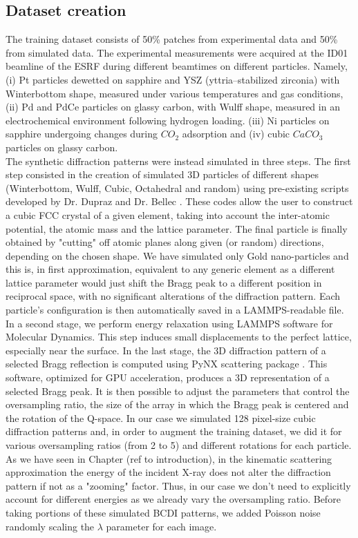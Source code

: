 \subsection{Dataset creation}
The training dataset consists of 50\% patches from experimental data and 50\% from simulated data.
The experimental measurements were acquired at the ID01 beamline of the ESRF during different beamtimes on different particles.
Namely, (i) Pt particles dewetted on sapphire and YSZ (yttria–stabilized zirconia) with Winterbottom shape, 
measured under various temperatures and gas conditions, (ii) Pd and PdCe particles on glassy carbon, with
Wulff shape, measured in an electrochemical environment following hydrogen loading. (iii) Ni particles on sapphire undergoing
changes during $CO_2$ adsorption and (iv) cubic $CaCO_3$ particles on glassy carbon.
\\
The synthetic diffraction patterns were instead simulated in three steps. The first step consisted in the creation of 
simulated 3D particles of different shapes (Winterbottom, Wulff, Cubic, Octahedral and random) using pre-existing scripts
developed by Dr. Dupraz and Dr. Bellec \cite{lim_convolutional_2021}. These codes allow the user to construct a cubic FCC
crystal of a given element, taking into account the inter-atomic potential, the atomic mass
and the lattice parameter. The final particle is finally obtained by "cutting" off atomic planes along given (or random)
directions, depending on the chosen shape. We have simulated only Gold nano-particles and this is, in first approximation,
equivalent to any generic element as a different lattice parameter would just shift the Bragg peak to a different 
position in reciprocal space, with no significant alterations of the diffraction pattern.  
Each particle's configuration is then automatically saved in a LAMMPS-readable file. In a second stage, we perform 
energy relaxation using LAMMPS software for Molecular Dynamics. This step induces small displacements to the perfect 
lattice, especially near the surface. In the last stage, the 3D diffraction pattern of a selected Bragg 
reflection is computed using PyNX scattering package \cite{pynx_scattering}. This software, optimized for GPU 
acceleration, produces a 3D representation of a selected Bragg peak. 
It is then possible to adjust the parameters that control the oversampling ratio, the size of the array in which the 
Bragg peak is centered and the rotation of the Q-space. In our case we simulated 128 pixel-size cubic diffraction 
patterns and, in order to augment the training dataset, we did it for various oversampling ratios (from 2 to 5) and 
different rotations for each particle. As we have seen in Chapter (ref to introduction), in the kinematic scattering 
approximation the energy of the incident X-ray does not alter the diffraction pattern if not as a "zooming" factor. 
Thus, in our case we don't need to explicitly account for different energies as we already vary the oversampling ratio. 
Before taking portions of these simulated BCDI patterns, we added Poisson noise randomly scaling the $\lambda$ parameter
for each image.


